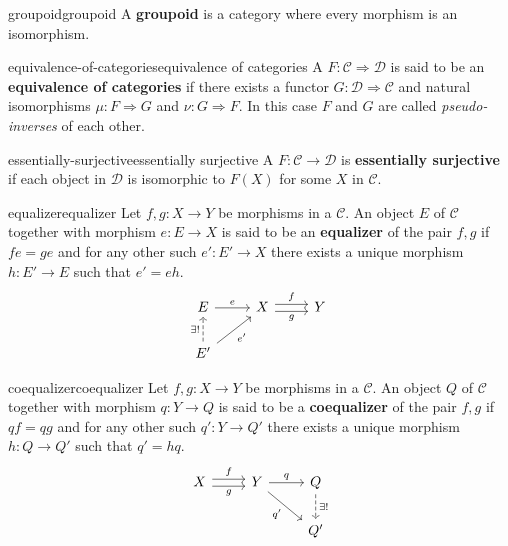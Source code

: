 \begin{topic}{groupoid}{groupoid}
    A \textbf{groupoid} is a category where every morphism is an isomorphism.
\end{topic}

\begin{topic}{equivalence-of-categories}{equivalence of categories}
    A  $F : \mathcal{C} \Rightarrow \mathcal{D}$ is said to be an \textbf{equivalence of categories} if there exists a functor $G : \mathcal{D} \Rightarrow \mathcal{C}$ and natural isomorphisms $\mu : F \Rightarrow G$ and $\nu : G \Rightarrow F$. In this case $F$ and $G$ are called \textit{pseudo-inverses} of each other.
\end{topic}

\begin{topic}{essentially-surjective}{essentially surjective}
    A  $F : \mathcal{C} \to \mathcal{D}$ is \textbf{essentially surjective} if each object in $\mathcal{D}$ is isomorphic to $F(X)$ for some $X$ in $\mathcal{C}$.
\end{topic}

\begin{topic}{equalizer}{equalizer}
    Let $f, g : X \to Y$ be morphisms in a  $\mathcal{C}$. An object $E$ of $\mathcal{C}$ together with morphism $e : E \to X$ is said to be an \textbf{equalizer} of the pair $f, g$ if $fe = ge$ and for any other such $e' : E' \to X$ there exists a unique morphism $h : E' \to E$ such that $e' = eh$.
    \[ \begin{tikzcd} E \arrow{r}{e} & X \arrow[shift left=0.25em]{r}{f} \arrow[swap, shift right=0.25em]{r}{g} & Y \\ E' \arrow[dashed]{u}{\exists!} \arrow[swap]{ur}{e'} && \end{tikzcd} \]
\end{topic}

\begin{topic}{coequalizer}{coequalizer}
    Let $f, g : X \to Y$ be morphisms in a  $\mathcal{C}$. An object $Q$ of $\mathcal{C}$ together with morphism $q : Y \to Q$ is said to be a \textbf{coequalizer} of the pair $f, g$ if $qf = qg$ and for any other such $q' : Y \to Q'$ there exists a unique morphism $h : Q \to Q'$ such that $q' = hq$.
    \[ \begin{tikzcd} X \arrow[shift left=0.25em]{r}{f} \arrow[swap, shift right=0.25em]{r}{g} & Y \arrow{r}{q} \arrow[swap]{dr}{q'} & Q \arrow[dashed]{d}{\exists!} \\ && Q' \end{tikzcd} \]
\end{topic}

